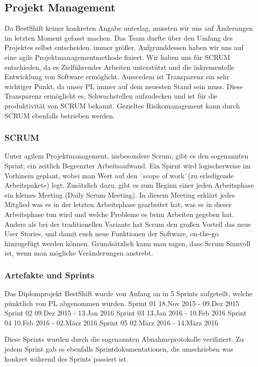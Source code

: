 \subsection{Projekt Management}

Da BestShift keiner konkreten Angabe unterlag,
mussten wir uns auf Änderungen im letzten Moment gefasst machen. Das Team 
durfte über den Umfang des Projektes selbst entscheiden.
immer größer. Aufgrunddessen haben wir uns auf eine agile Projektmanagementmethode fixiert. 
Wir haben uns für SCRUM entschieden, da es Zielführendes Arbeiten unterstützt und die inkrementelle Entwicklung
von Software ermöglicht. Ausserdem ist Transparenz ein sehr wichtiger Punkt, da unser PL immer auf dem neuesten
Stand sein muss. Diese Transparenz ermöglicht es, Schwachstellen aufzudecken und ist für die produktivität von SCRUM bekannt.
Gezieltes Risikomanagement kann durch SCRUM ebenfalls betrieben werden. 


\subsubsection{SCRUM}
Unter agilem Projektmanagement, insbesondere Scrum, gibt es den sogenannten
Sprint; ein zeitlich Begrenzter Arbeitsaufwand. Ein Spirnt wird logischerweise
im Vorhinein geplant, wobei man Wert auf den ¨scope of work¨(zu erledigende
Arbeitspakete) legt. Zusätzlich dazu, gibt es zum Beginn einer jeden
Arbeitsphase ein kleines Meeting (Daily Scrum Meeting). In diesem Meeting
erklärt jedes Mitglied was es in der letzten Arbeitsphase gearbeitet hat, was es in
dieser Arbeitsphase tun wird und welche Probleme es beim Arbeiten gegeben
hat.
Anders als bei der traditionellen Variante hat Scrum den großen Vorteil das neue
User Stories, und damit euch neue Funktionen der Software, on-the-go hinzugefügt
werden können. Grundsätzlich kann man sagen, dass Scrum Sinnvoll ist,
wenn man mögliche Veränderungen anstrebt.

\subsubsection{Artefakte und Sprints}
Das Diplomprojekt BestShift wurde von Anfang an in 5 Sprints aufgeteilt, welche pünktlich
von PL abgenommen wurden.
Sprint 01 18.Nov 2015 - 09.Dez 2015
Sprint 02 09.Dez 2015 - 13.Jan 2016
Sprint 03 13.Jan 2016 - 10.Feb 2016
Sprint 04 10.Feb 2016 - 02.März 2016
Sprint 05 02.März 2016 - 14.März 2016

Diese Sprints wurden durch die sogenannten Abnahmeprotokolle verifiziert.
Zu jedem Sprint gab es ebenfalls Sprintdokumentationen, die umschrieben was konkret 
während des Sprints passiert ist.


\clearpage %